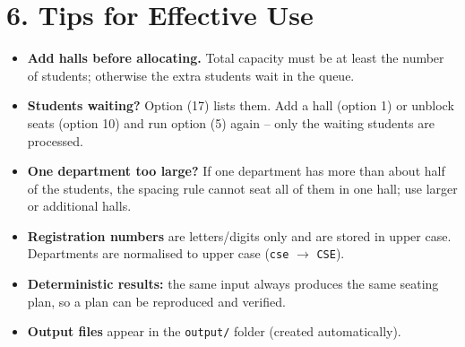 \documentclass[a4paper,12pt]{article}
\begin{document}
\section*{6. Tips for Effective Use}
\begin{itemize}
    \item \textbf{Add halls before allocating.} Total capacity must be at least the number of students; otherwise the extra students wait in the queue.
    \item \textbf{Students waiting?} Option (17) lists them. Add a hall (option 1) or unblock seats (option 10) and run option (5) again -- only the waiting students are processed.
    \item \textbf{One department too large?} If one department has more than about half of the students, the spacing rule cannot seat all of them in one hall; use larger or additional halls.
    \item \textbf{Registration numbers} are letters/digits only and are stored in upper case. Departments are normalised to upper case (\texttt{cse} $\to$ \texttt{CSE}).
    \item \textbf{Deterministic results:} the same input always produces the same seating plan, so a plan can be reproduced and verified.
    \item \textbf{Output files} appear in the \texttt{output/} folder (created automatically).
\end{itemize}
\end{document}
